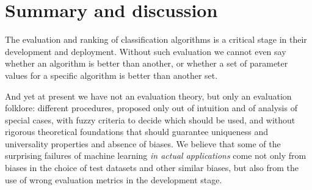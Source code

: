 \documentclass[\ifafour a4paper,12pt,\else a5paper,10pt,\fi%
onecolumn,oneside,article,%
british%
]{memoir}
\theoremstyle{remark}
\theoremstyle{innote}
\renewcommand*{\|}[1][]{\nonscript\:#1\vert\nonscript\:\mathopen{}}
\newcommand*{\eg}{{e.g.}}
\begin{document}
%




\section{Summary and discussion}
\label{sec:discussion}

The evaluation and ranking of classification algorithms is a critical stage in their development and deployment. Without such evaluation we cannot even say whether an algorithm is better than another, or whether a set of parameter values for a specific algorithm is better than another set.

And yet at present we have not an evaluation theory, but only an evaluation folklore: different procedures, proposed only out of intuition and of analysis of special cases, with fuzzy criteria to decide which should be used, and without rigorous theoretical foundations that should guarantee uniqueness and universality properties and absence of biases. We believe that some of the surprising failures of machine learning \emph{in actual applications}\autocites[see \eg][]{varoquauxetal2022} come not only from biases in the choice of test datasets and other similar biases, but also from the use of wrong evaluation metrics in the development stage.
\end{document}
